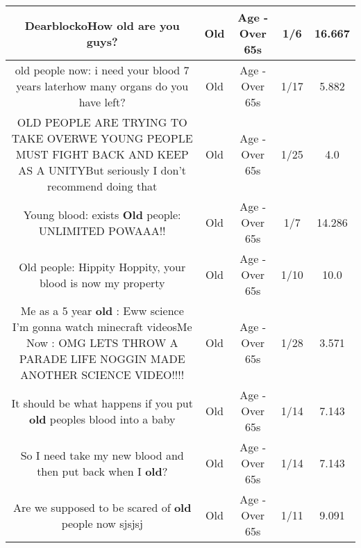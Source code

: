 \documentclass[11pt]{article}
\newlength\mylength
\begin{document}
\begin{center}
\begin{longtable}{|C{.65\mylength}|C{.30\mylength}|C{.12\mylength}|C{.12\mylength}|C{.12\mylength}|}
  \small DearblockoHow \textbf{old} are you guys?\normalsize   & Old & Age - Over 65s & 1/6 & 16.667 \\  \hline
  \small old people now: i need your blood     7 years laterhow many organs do you have left?\normalsize   & Old & Age - Over 65s & 1/17 & 5.882 \\  \hline
  \small OLD PEOPLE ARE TRYING TO TAKE OVERWE YOUNG PEOPLE MUST FIGHT BACK AND KEEP AS A UNITYBut seriously I don't recommend doing that\normalsize   & Old & Age - Over 65s & 1/25 & 4.0 \\  \hline
  \small Young blood: exists \textbf{Old} people: UNLIMITED POWAAA!!\normalsize   & Old & Age - Over 65s & 1/7 & 14.286 \\  \hline
  \small Old people: Hippity Hoppity, your blood is now my property\normalsize   & Old & Age - Over 65s & 1/10 & 10.0 \\  \hline
  \small Me as a 5 year \textbf{old} : Eww science I'm gonna watch minecraft videosMe Now : OMG LETS THROW A PARADE LIFE NOGGIN MADE ANOTHER SCIENCE VIDEO!!!!\normalsize   & Old & Age - Over 65s & 1/28 & 3.571 \\  \hline
  \small It should be what happens if you put \textbf{old} peoples blood into a baby\normalsize   & Old & Age - Over 65s & 1/14 & 7.143 \\  \hline
  \small So I need take my new blood and then put back when I \textbf{old}?\normalsize   & Old & Age - Over 65s & 1/14 & 7.143 \\  \hline
  \small Are we supposed to be scared of \textbf{old} people now sjsjsj\normalsize   & Old & Age - Over 65s & 1/11 & 9.091 \\  \hline

\end{longtable}
\end{center}
\end{document}
